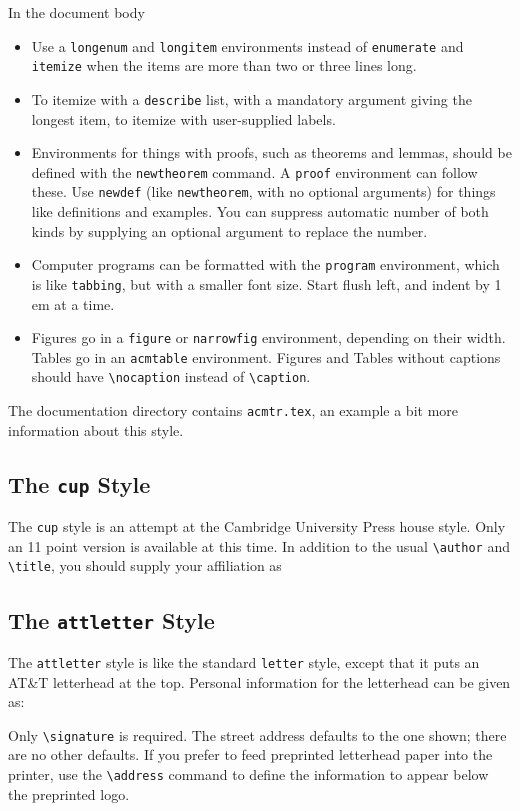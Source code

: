 In the document body
\begin{itemize}
\item
Use a \verb|longenum| and \verb|longitem| environments instead
of \verb|enumerate| and \verb|itemize| when
the items are more than two or three lines long.
\item
To itemize with a \verb|describe| list, with a mandatory argument giving the
longest item, to itemize with user-supplied labels.
\item
Environments for things with proofs, such as theorems and lemmas,
should be defined with the \verb|newtheorem| command.
A \verb|proof| environment can follow these.
Use \verb|newdef| (like \verb|newtheorem|, with no optional arguments)
for things like definitions and examples.  You can suppress automatic
number of both kinds by supplying an optional argument to replace
the number.
\item
Computer programs can be formatted with the \verb|program| environment,
which is like \verb|tabbing|, but with a smaller font size.
Start flush left, and indent by 1 em at a time.
\item
Figures go in a \verb|figure| or \verb|narrowfig| environment,
depending on their width.
Tables go in an \verb|acmtable| environment.
Figures and Tables without captions should have \verb|\nocaption|
instead of \verb|\caption|.
\end{itemize}

The documentation directory contains \verb|acmtr.tex|, an example
a bit more information about this style.

\subsection{The {\tt cup} Style}

The {\tt cup} style is an attempt at the Cambridge University Press
house style.
Only an 11 point version is available at this time.
In addition to the usual \verb|\author| and \verb|\title|,
you should supply your affiliation as
\begin{eg}
\end{eg}


\subsection{The {\tt attletter} Style}

The {\tt attletter} style is like the standard {\tt letter} style,
except that it puts an AT\&T letterhead at the top.
Personal information for the letterhead can be given as:
\begin{eg}
\signature{Howard Trickey}
\end{eg}
Only \verb|\signature| is required.
The street address defaults to the one shown;
there are no other defaults.
If you prefer to feed preprinted letterhead paper into
the printer, use the \verb|\address| command to define
the information to appear below the preprinted logo.

